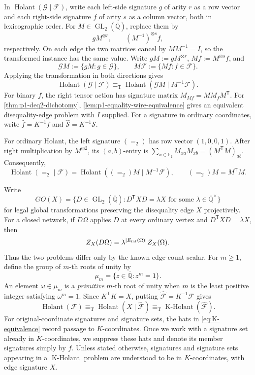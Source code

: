 \documentclass[11pt,letterpaper,onecolumn]{article}
\theoremstyle{plain}
\theoremstyle{definition}
\theoremstyle{remark}
\newcommand{\AlgNums}{\overline{\mathbb Q}}
\newcommand{\Ftwo}{\mathbb F_2}
\newcommand{\cF}{\mathcal F}
\newcommand{\cG}{\mathcal G}
\newcommand{\cS}{\mathcal S}
\newcommand{\Holant}{\operatorname{Holant}}
\newcommand{\KHolant}{\operatorname{K\text{-}Holant}}
\newcommand{\GL}{\operatorname{GL}}
\newcommand{\Eq}{=}
\newcommand{\equivT}{\equiv_{\mathrm T}}
\begin{document}
In \(\Holant(\cG\mid\cF)\), write each left-side signature \(g\)
of arity \(r\) as a row vector and each right-side signature \(f\) of
arity \(s\) as a column vector, both in lexicographic order. For
\(M\in\GL_2(\AlgNums)\), replace them by
\[
  gM^{\otimes r},\qquad (M^{-1})^{\otimes s}f,
\]
respectively. On each edge the two matrices cancel by \(MM^{-1}=I\),
so the transformed instance has the same value. Write
\(gM:=gM^{\otimes r}\), \(Mf:=M^{\otimes s}f\), and
\[
  \cG M:=\{gM:g\in\cG\},\qquad M\cF:=\{Mf:f\in\cF\}.
\]
Applying the transformation in both directions gives
\[
  \Holant(\cG\mid\cF)
  \equivT\Holant(\cG M\mid M^{-1}\cF).
\]
For binary \(f\), the right tensor action has signature matrix
\(M_{Mf}=M M_f M^{\mathsf T}\). For \cref{thm:p1-deq2-dichotomy},
\cref{lem:p1-equality-wire-equivalence} gives an equivalent disequality-edge
problem with \(I\) supplied. For a signature in ordinary
coordinates, write \(\widehat f=K^{-1}f\) and
\(\widehat{\cS}=K^{-1}\cS\).

For ordinary Holant, the left signature \((\Eq_2)\) has row vector
\((1,0,0,1)\). After right multiplication by \(M^{\otimes2}\), its
\((a,b)\)-entry is \(\sum_{x\in\Ftwo}M_{xa}M_{xb}=(M^{\mathsf T}M)_{ab}\).
Consequently,
\begin{equation*}
  \Holant(\Eq_2\mid\cF)
  =\Holant((\Eq_2)M\mid M^{-1}\cF),
  \qquad (\Eq_2)M=M^{\mathsf T}M.
\end{equation*}

Write
\begin{equation*}
  GO(X)
  =
  \{D\in\GL_2(\AlgNums):D^{\mathsf T}XD=\lambda X
    \text{ for some }\lambda\in\AlgNums^\times\}
\end{equation*}
for legal global transformations preserving the disequality edge
\(X\) projectively.  For a closed network, if \(D\Omega\) applies \(D\) at
every ordinary vertex and
\(D^{\mathsf T}XD=\lambda X\), then
\begin{equation}
  Z_X(D\Omega)=\lambda^{|E_{\rm int}(\Omega)|}Z_X(\Omega).
  \label{eq:GOX-global-scalar}
\end{equation}
Thus the two problems differ only by the known edge-count scalar. For \(m\ge1\), define
the group of \(m\)-th roots of unity by
\[
  \mu_m=\{z\in\AlgNums:z^m=1\}.
\]
An element \(\omega\in\mu_m\) is a \emph{primitive} \(m\)-th root of
unity when \(m\) is the least positive integer satisfying \(\omega^m=1\).
Since \(K^{\mathsf T}K=X\), putting
\(\widehat{\cF}=K^{-1}\cF\) gives
\begin{equation}
  \Holant(\cF)
  \equivT
  \Holant(X\mid\widehat{\cF})
  \equivT
  \KHolant(\widehat{\cF}).
  \label{eq:K-equivalence}
\end{equation}
For original-coordinate signatures and signature sets, the hats in
\cref{eq:K-equivalence} record passage to \(K\)-coordinates.  Once we work
with a signature set already in \(K\)-coordinates, we suppress
these hats and denote its member signatures simply by \(f\).  Unless stated
otherwise, signatures and signature sets appearing in a \(\KHolant\) problem
are understood to be in \(K\)-coordinates, with edge signature \(X\).
\end{document}
